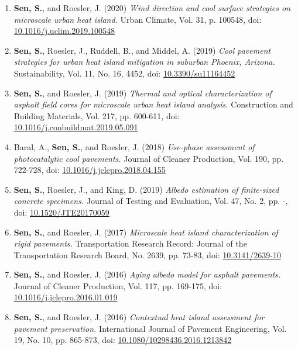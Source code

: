 \documentclass[12pt]{article}
\begin{document}
\begin{enumerate}[label=(J\arabic*)]
		\item \textbf{Sen, S.}, and Roesler, J. (2020) \textit{Wind direction and cool surface strategies on microscale urban heat island.}  Urban Climate, Vol. 31, p. 100548, doi: \href{https://doi.org/10.1016/j.uclim.2019.100548}{10.1016/j.uclim.2019.100548}
	\item \textbf{Sen, S.}, Roesler, J., Ruddell, B., and Middel, A. (2019) \textit{Cool pavement strategies for urban heat island mitigation in suburban Phoenix, Arizona.}  Sustainability, Vol. 11, No. 16, 4452, doi: \href{https://doi.org/10.3390/su11164452}{10.3390/su11164452}
		\item \textbf{Sen, S.}, and Roesler, J. (2019) \textit{Thermal and optical characterization of asphalt field cores for microscale urban heat island analysis.}  Construction and Building Materials, Vol. 217, pp. 600-611, doi: \href{https://doi.org/10.1016/j.conbuildmat.2019.05.091}{10.1016/j.conbuildmat.2019.05.091}
	\item Baral, A., \textbf{Sen, S.}, and Roesler, J. (2018) \textit{Use-phase assessment of photocatalytic cool pavements.}  Journal of Cleaner Production, Vol. 190, pp. 722-728, doi: \href{https://doi.org/10.1016/j.jclepro.2018.04.155}{10.1016/j.jclepro.2018.04.155}
	\item \textbf{Sen, S.}, Roesler, J., and King, D. (2019) \textit{Albedo estimation of finite-sized concrete specimens.} Journal of Testing and Evaluation, Vol. 47, No. 2, pp. -, doi: \href{https://doi.org/10.1520/JTE20170059}{10.1520/JTE20170059}
	\item \textbf{Sen, S.}, and Roesler, J. (2017) \textit{Microscale heat island characterization of rigid pavements.} Transportation Research Record: Journal of the Transportation Research Board, No. 2639, pp. 73-83, doi: \href{http://dx.doi.org/10.3141/2639-10}{10.3141/2639-10}
	\item \textbf{Sen, S.}, and Roesler, J. (2016) \textit{Aging albedo model for asphalt pavements.} Journal of Cleaner Production, Vol. 117, pp. 169-175, doi: \href{http://dx.doi.org/10.1016/j.jclepro.2016.01.019}{10.1016/j.jclepro.2016.01.019}
	\item \textbf{Sen, S.}, and Roesler, J. (2016) \textit{Contextual heat island assessment for pavement preservation.} International Journal of Pavement Engineering, Vol. 19, No. 10, pp. 865-873, doi: \href{https://www.tandfonline.com/doi/full/10.1080/10298436.2016.1213842}{10.1080/10298436.2016.1213842}
\end{enumerate} 
\end{document}
